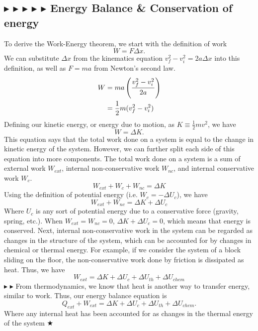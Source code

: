 %
%
\subsection{\color{OrangeRed} $\blacktriangleright$ \color{RoyalBlue} $\blacktriangleright$ \color{PineGreen} $\blacktriangleright$ \color{Goldenrod} $\blacktriangleright$ \color{Orchid} $\blacktriangleright$ \color{black} Energy Balance \& Conservation of energy}\label{1.3.2}
To derive the Work-Energy theorem, we start with the definition of work
\begin{equation}
    W = F\Delta x.
\end{equation}
We can substitute $\Delta x$ from the kinematics equation $v_f^2-v_i^2=2a\Delta x$ into this definition, as well as $F=ma$ from Newton's second law.
\begin{align}
    W &= ma \left(\frac{v_f^2-v_i^2}{2a}\right) \nonumber \\
    &= \frac12 m(v_f^2-v_i^2)
\end{align}
Defining our kinetic energy, or energy due to motion, as $K \equiv \tfrac12mv^2$, we have
\begin{equation}
    \boxed{W=\Delta K}.
\end{equation}
This equation says that the total work done on a system is equal to the change in kinetic energy of the system. However, we can further split each side of this equation into more components. The total work done on a system is a sum of external work $W_{ext}$, internal non-conservative work $W_{nc}$, and internal conservative work $W_c$.
\begin{equation}
    W_{ext} + W_c + W_{nc} = \Delta K
\end{equation}
Using the definition of potential energy (i.e. $W_c = -\Delta U_c$), we have
\begin{equation}
    W_{ext} + W_{nc} = \Delta K + \Delta U_c
\end{equation}
Where $U_c$ is any sort of potential energy due to a conservative force (gravity, spring, etc.). When $W_{ext} = W_{nc} = 0$, $\Delta K + \Delta U_c = 0$, which means that energy is conserved. Next, internal non-conservative work in the system can be regarded as changes in the structure of the system, which can be accounted for by changes in chemical or thermal energy. For example, if we consider the system of a block sliding on the floor, the non-conservative work done by friction is dissipated as heat. Thus, we have
\begin{equation}
    \boxed{W_{ext} = \Delta K + \Delta U_c + \Delta U_{th} + \Delta U_{chem}}
\end{equation}
\noindent\color{RoyalBlue} $\blacktriangleright$ \color{Orchid} $\blacktriangleright$ \color{black} From thermodynamics, we know that heat is another way to transfer energy, similar to work. Thus, our energy balance equation is
\begin{equation}
    \boxed{Q_{ext} + W_{ext} = \Delta K + \Delta U_c + \Delta U_{th} + \Delta U_{chem}}.
\end{equation}
Where any internal heat has been accounted for as changes in the thermal energy of the system $\bigstar$


